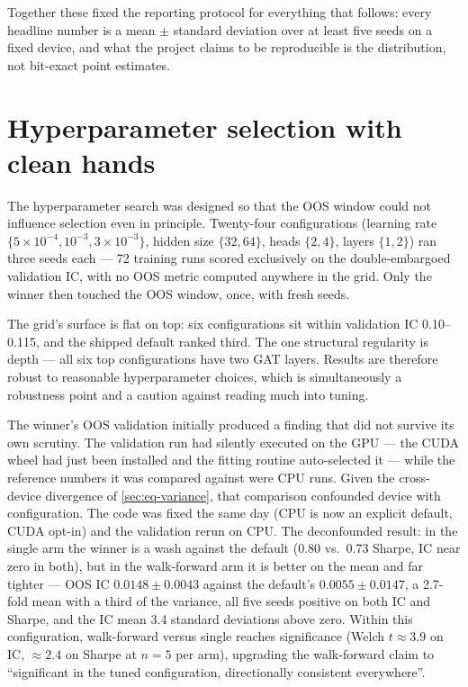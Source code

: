 Together these fixed the reporting protocol for everything that follows:
every headline number is a mean $\pm$ standard deviation over at least
five seeds on a fixed device, and what the project claims to be
reproducible is the distribution, not bit-exact point estimates.

\section{Hyperparameter selection with clean hands}
\label{sec:eq-hp}

The hyperparameter search was designed so that the OOS window could not
influence selection even in principle. Twenty-four configurations
(learning rate $\{5\times10^{-4}, 10^{-3}, 3\times10^{-3}\}$, hidden size
$\{32, 64\}$, heads $\{2, 4\}$, layers $\{1, 2\}$) ran three seeds each
--- 72 training runs scored exclusively on the double-embargoed
validation IC, with no OOS metric computed anywhere in the grid. Only the
winner then touched the OOS window, once, with fresh seeds.

The grid's surface is flat on top: six configurations sit within
validation IC 0.10--0.115, and the shipped default ranked third. The one
structural regularity is depth --- all six top configurations have two
GAT layers. Results are therefore robust to reasonable hyperparameter
choices, which is simultaneously a robustness point and a caution against
reading much into tuning.

The winner's OOS validation initially produced a finding that did not
survive its own scrutiny. The validation run had silently executed on the
GPU --- the CUDA wheel had just been installed and the fitting routine
auto-selected it --- while the reference numbers it was compared against
were CPU runs. Given the cross-device divergence of
\cref{sec:eq-variance}, that comparison confounded device with
configuration. The code was fixed the same day (CPU is now an explicit
default, CUDA opt-in) and the validation rerun on CPU. The deconfounded
result: in the single arm the winner is a wash against the default (0.80
vs.\ 0.73 Sharpe, IC near zero in both), but in the walk-forward arm it
is better on the mean and far tighter --- OOS IC $0.0148 \pm 0.0043$
against the default's $0.0055 \pm 0.0147$, a 2.7-fold mean with a third
of the variance, all five seeds positive on both IC and Sharpe, and the
IC mean 3.4 standard deviations above zero. Within this configuration,
walk-forward versus single reaches significance (Welch $t \approx 3.9$ on
IC, $\approx 2.4$ on Sharpe at $n=5$ per arm), upgrading the walk-forward
claim to ``significant in the tuned configuration, directionally
consistent everywhere''.

